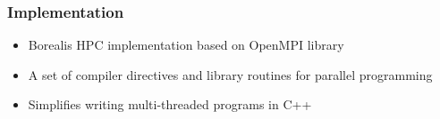 \begin{frame}
\frametitle{Implementation}
\begin{itemize}
	\item Borealis HPC implementation based on OpenMPI library
	\item A set of compiler directives and library routines for parallel programming
	\item Simplifies writing multi-threaded programs in C++
\end{itemize}
\end{frame}

